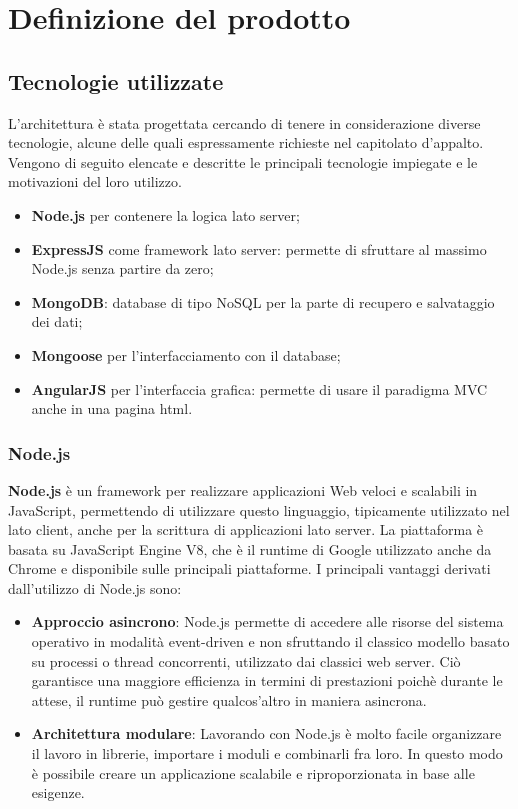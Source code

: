 \section{Definizione del prodotto}


\subsection{Tecnologie utilizzate}
L'architettura è stata progettata cercando di tenere in considerazione diverse tecnologie, alcune delle quali espressamente richieste nel capitolato d'appalto. Vengono di seguito elencate e descritte le principali tecnologie impiegate e le motivazioni del loro utilizzo.

\begin{itemize}
	\item \textbf{Node.js} per contenere la logica lato server;
	\item \textbf{ExpressJS} come framework lato server: permette di sfruttare al massimo Node.js senza partire da zero;
	\item \textbf{MongoDB}: database di tipo NoSQL per la parte di recupero e salvataggio dei dati;
	\item \textbf{Mongoose} per l’interfacciamento con il database;
	\item \textbf{AngularJS} per l'interfaccia grafica: permette di usare il paradigma MVC anche in una pagina html.
\end{itemize}


\subsubsection{Node.js}
\textbf{Node.js} è un framework per realizzare applicazioni Web veloci e scalabili in JavaScript, permettendo di utilizzare questo linguaggio, tipicamente utilizzato nel lato client, anche per la scrittura di applicazioni lato server.
La piattaforma è basata su JavaScript Engine V8, che è il runtime di Google utilizzato anche da Chrome e disponibile sulle principali piattaforme. \newline
I principali vantaggi derivati dall'utilizzo di Node.js sono:
\begin{itemize}
	\item \textbf{Approccio asincrono}: Node.js permette di accedere alle risorse del sistema operativo in modalità event-driven e non sfruttando il classico modello basato su processi o thread concorrenti, utilizzato dai classici web server. Ciò garantisce una maggiore efficienza in termini di prestazioni poichè durante le attese, il runtime può gestire qualcos’altro in maniera asincrona.
	\item \textbf{Architettura modulare}: Lavorando con Node.js è molto facile organizzare il lavoro in librerie, importare i moduli e combinarli fra loro. In questo modo è possibile creare un applicazione scalabile e riproporzionata in base alle esigenze.
\end{itemize}

